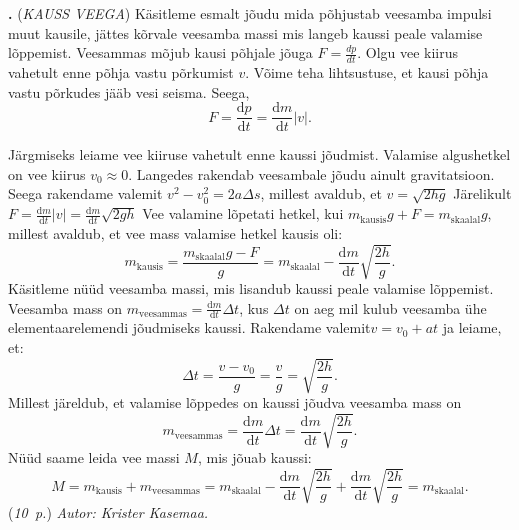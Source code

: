 \documentclass[12pt,a5paper]{article}
\newcommand{\numb}[1]{\vspace{5pt}\textbf{\large #1}}
\newcommand{\nimi}[1]{(\textsl{\small #1})}
\newcommand{\punktid}[1]{(\emph{#1~p.})}
\newcommand{\autor}[1]{\emph{ Autor: #1.}}
\newcounter{ylesanne}
\newcommand{\yl}[1]{\addtocounter{ylesanne}{1}\numb{\theylesanne.} \nimi{#1} \newblock{}}
\begin{document}
\yl{KAUSS VEEGA}
Käsitleme esmalt jõudu mida põhjustab veesamba impulsi muut kausile, jättes kõrvale veesamba massi mis langeb kaussi peale valamise lõppemist. Veesammas mõjub kausi põhjale jõuga $F=\frac{dp}{dt}$. Olgu vee kiirus vahetult enne põhja vastu põrkumist $v$. Võime teha lihtsustuse, et kausi põhja vastu põrkudes jääb vesi seisma. Seega,
\[
F=\frac{\mathrm{d}{p}}{\mathrm{d}{t}}=\frac{\mathrm{d}{m}}{\mathrm{d}{t}} |v|.
\]\par 
\noindent Järgmiseks leiame vee kiiruse vahetult enne kaussi jõudmist.  Valamise algushetkel on vee kiirus $v_0\approx 0$. Langedes rakendab veesambale jõudu ainult gravitatsioon. Seega rakendame valemit $v^2-v_0^2=2a\Delta s$, millest avaldub, et $v=\sqrt{2hg}$
Järelikult $F=\frac{\mathrm{d}{m}}{\mathrm{d}{t}} |v|=\frac{\mathrm{d}{m}}{\mathrm{d}{t}}\sqrt{2gh}$
Vee valamine lõpetati hetkel, kui $m_{\mathrm{kausis}} g+F=m_\mathrm{skaalal}g$, millest avaldub, et vee mass valamise hetkel kausis oli:
\begin{equation*}
m_{\mathrm{kausis}}=\frac{m_{\mathrm{skaalal}} g-F}{g}=m_{\mathrm{skaalal}}-\frac{\mathrm{d}{m}}{\mathrm{d}{t}}\sqrt{\frac{2h}{g}}.
\end{equation*}
Käsitleme nüüd veesamba massi, mis lisandub kaussi peale valamise lõppemist. Veesamba mass on $m_{\mathrm{veesammas}}=\frac{\mathrm{d}{m}}{\mathrm{d}{t}}\Delta t$, kus $\Delta t$ on aeg mil kulub veesamba ühe elementaarelemendi jõudmiseks kaussi. Rakendame valemit$v=v_0+at$ ja leiame, et:
\begin{equation*}
\Delta t = \frac{v-v_0}{g}=\frac{v}{g}=\sqrt{\frac{2h}{g}}.
\end{equation*}
Millest järeldub, et valamise lõppedes on kaussi jõudva veesamba mass on
\begin{equation*}
m_{\mathrm{veesammas}}=\frac{\mathrm{d}{m}}{\mathrm{d}{t}} \Delta t = \frac{\mathrm{d}{m}}{\mathrm{d}{t}}\sqrt{\frac{2h}{g}}.
\end{equation*}
Nüüd saame leida vee massi $M$, mis jõuab kaussi:
\begin{equation*}
M=m_{\mathrm{kausis}}+m_{\mathrm{veesammas}}=m_{\mathrm{skaalal}}-\frac{\mathrm{d}{m}}{\mathrm{d}{t}}\sqrt{\frac{2h}{g}}+\frac{\mathrm{d}{m}}{\mathrm{d}{t}}\sqrt{\frac{2h}{g}}=m_{\mathrm{skaalal}}.
\end{equation*}
\punktid{10}\autor{Krister Kasemaa}
\end{document}
